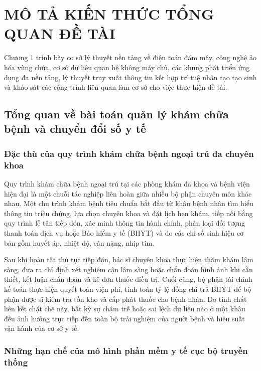 \chapter{MÔ TẢ KIẾN THỨC TỔNG QUAN ĐỀ TÀI}

Chương 1 trình bày cơ sở lý thuyết nền tảng về điện toán đám mây, công nghệ ảo hóa vùng chứa, cơ sở dữ liệu quan hệ không máy chủ, các khung phát triển ứng dụng đa nền tảng, lý thuyết truy xuất thông tin kết hợp trí tuệ nhân tạo tạo sinh và khảo sát các công trình liên quan làm cơ sở cho việc thực hiện đề tài.

\section{Tổng quan về bài toán quản lý khám chữa bệnh và chuyển đổi số y tế}

\subsection{Đặc thù của quy trình khám chữa bệnh ngoại trú đa chuyên khoa}

Quy trình khám chữa bệnh ngoại trú tại các phòng khám đa khoa và bệnh viện hiện đại là một chuỗi tác nghiệp liên hoàn giữa nhiều bộ phận chuyên môn khác nhau. Một chu trình khám bệnh tiêu chuẩn bắt đầu từ khâu bệnh nhân tìm hiểu thông tin triệu chứng, lựa chọn chuyên khoa và đặt lịch hẹn khám, tiếp nối bằng quy trình lễ tân tiếp đón, xác minh thông tin hành chính, phân loại đối tượng thanh toán dịch vụ hoặc Bảo hiểm y tế (BHYT) và đo các chỉ số sinh hiệu cơ bản gồm huyết áp, nhiệt độ, cân nặng, nhịp tim.

Sau khi hoàn tất thủ tục tiếp đón, bác sĩ chuyên khoa thực hiện thăm khám lâm sàng, đưa ra chỉ định xét nghiệm cận lâm sàng hoặc chẩn đoán hình ảnh khi cần thiết, kết luận chẩn đoán và kê đơn thuốc điều trị. Cuối cùng, bộ phận tài chính kế toán thực hiện quyết toán viện phí, tính toán tỷ lệ đồng chi trả BHYT để bộ phận dược sĩ kiểm tra tồn kho và cấp phát thuốc cho bệnh nhân. Do tính chất liên kết chặt chẽ này, bất kỳ sự chậm trễ hoặc sai lệch dữ liệu nào ở một khâu đều ảnh hưởng trực tiếp đến toàn bộ trải nghiệm của người bệnh và hiệu suất vận hành của cơ sở y tế.

\subsection{Những hạn chế của mô hình phần mềm y tế cục bộ truyền thống}

